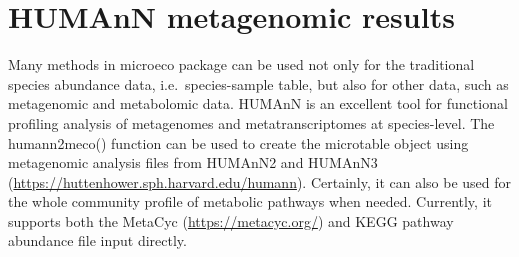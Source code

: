 \documentclass[
]{book}
\begin{document}
\hypertarget{humann-metagenomic-results}{%
\section{HUMAnN metagenomic results}\label{humann-metagenomic-results}}

Many methods in microeco package can be used not only for the traditional species abundance data, i.e.~species-sample table,
but also for other data, such as metagenomic and metabolomic data.
HUMAnN \citep{Franzosa_Species_2018} is an excellent tool for functional profiling analysis of metagenomes and metatranscriptomes at species-level.
The humann2meco() function can be used to create the microtable object using metagenomic analysis files from HUMAnN2 and HUMAnN3 (\url{https://huttenhower.sph.harvard.edu/humann}).
Certainly, it can also be used for the whole community profile of metabolic pathways when needed.
Currently, it supports both the MetaCyc (\url{https://metacyc.org/}) and KEGG pathway abundance file input directly.
\end{document}
